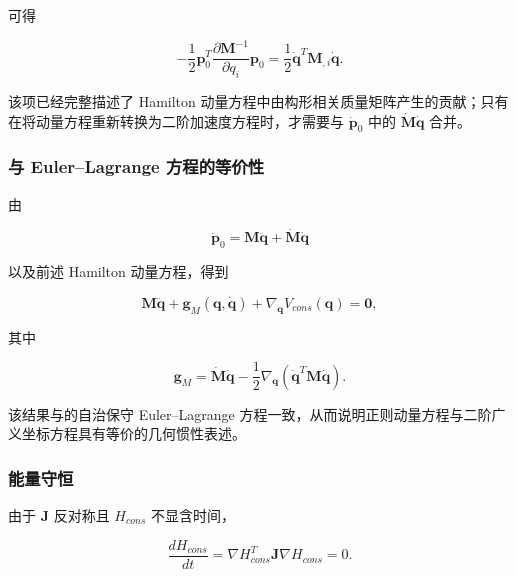 可得

\begin{equation}
\label{eq:hamiltonian-3-25}
- \frac{1}{2}\mathbf{p}_{0}^{T}\frac{\partial\mathbf{M}^{- 1}}{\partial q_{i}}\mathbf{p}_{0} = \frac{1}{2}{\dot{\mathbf{q}}}^{T}\mathbf{M}_{,i}\dot{\mathbf{q}}.
\end{equation}

该项已经完整描述了 Hamilton 动量方程中由构形相关质量矩阵产生的贡献；只有在将动量方程重新转换为二阶加速度方程时，才需要与 \({\dot{\mathbf{p}}}_{0}\) 中的 \(\dot{\mathbf{M}}\dot{\mathbf{q}}\) 合并。

\subsubsection{与 Euler--Lagrange 方程的等价性}\label{sec:hamiltonian-3-3-3}

由

\begin{equation}
\label{eq:hamiltonian-3-26}
{\dot{\mathbf{p}}}_{0} = \mathbf{M}\ddot{\mathbf{q}} + \dot{\mathbf{M}}\dot{\mathbf{q}}
\end{equation}

以及前述 Hamilton 动量方程，得到

\begin{equation}
\label{eq:hamiltonian-3-27}
\boxed{\mathbf{M}\ddot{\mathbf{q}} + \mathbf{g}_{M}\left( \mathbf{q},\dot{\mathbf{q}} \right) + \nabla_{\mathbf{q}}V_{cons}\left( \mathbf{q} \right) = \mathbf{0},}
\end{equation}

其中

\begin{equation}
\label{eq:hamiltonian-3-28}
\boxed{\mathbf{g}_{M} = \dot{\mathbf{M}}\dot{\mathbf{q}} - \frac{1}{2}\nabla_{\mathbf{q}}\left( {\dot{\mathbf{q}}}^{T}\mathbf{M}\dot{\mathbf{q}} \right).}
\end{equation}

该结果与的自治保守 Euler--Lagrange 方程一致，从而说明正则动量方程与二阶广义坐标方程具有等价的几何惯性表述。

\subsubsection{能量守恒}\label{sec:hamiltonian-3-3-4}

由于 \(\mathbf{J}\) 反对称且 \(H_{cons}\) 不显含时间，

\begin{equation}
\label{eq:hamiltonian-3-29}
\frac{dH_{cons}}{dt} = \nabla H_{cons}^{T}\mathbf{J}\nabla H_{cons} = 0.
\end{equation}

